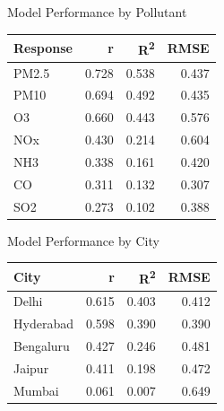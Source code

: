 \documentclass[svgnames, 10pt]{beamer}
\begin{document}
\begin{frame}{Model Performance by Pollutant}
    \begin{table}
    \centering
    \begin{tabular}{lrrr}
    \hline
    Response & r & R\textsuperscript{2} & RMSE \\
    \hline
    PM2.5 & 0.728 & 0.538 & 0.437 \\
    PM10 & 0.694 & 0.492 & 0.435 \\
    O3 & 0.660 & 0.443 & 0.576 \\
    NOx & 0.430 & 0.214 & 0.604 \\
    NH3 & 0.338 & 0.161 & 0.420 \\
    CO & 0.311 & 0.132 & 0.307 \\
    SO2 & 0.273 & 0.102 & 0.388 \\
    \hline
    \end{tabular}
    \end{table}
    \end{frame}
    
    \begin{frame}{Model Performance by City}
    \begin{table}
    \centering
    \begin{tabular}{lrrr}
    \hline
    City & r & R\textsuperscript{2} & RMSE \\
    \hline
    Delhi & 0.615 & 0.403 & 0.412 \\
    Hyderabad & 0.598 & 0.390 & 0.390 \\
    Bengaluru & 0.427 & 0.246 & 0.481 \\
    Jaipur & 0.411 & 0.198 & 0.472 \\
    Mumbai & 0.061 & 0.007 & 0.649 \\
    \hline
    \end{tabular}
    \end{table}
\end{frame}
\end{document}

